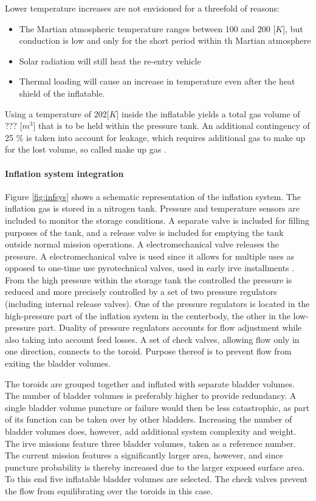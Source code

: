 Lower temperature increases are not envisioned for a threefold of reasons:

\begin{itemize}
\item The Martian atmospheric temperature ranges between 100 and 200 [$K$], but conduction is low and only for the short period within th Martian atmosphere
\item Solar radiation will still heat the re-entry vehicle
\item Thermal loading will cause an increase in temperature even after the heat shield of the inflatable.
\end{itemize}

Using a temperature of 202[$K$] inside the inflatable yields a total gas volume of ??? [$m^{3}$] that is to be held within the pressure tank. An additional contingency of 25 $\%$ is taken into account for leakage, which requires additional gas to make up for the lost volume, so called make up gas \cite{Jenkins2001}. 

\paragraph{Inflation system integration}


Figure \ref{fig:infsys} shows a schematic representation of the inflation system. The inflation gas is stored in a nitrogen tank. Pressure and temperature sensors are included to monitor the storage conditions. A separate valve is included for filling purposes of the tank, and a release valve is included for emptying the tank outside normal mission operations. A electromechanical valve releases the pressure. A electromechanical valve is used since it allows for multiple uses as opposed to one-time use pyrotechnical valves, used in early \gls{irve} installments \cite{Hughes2005}. From the high pressure within the storage tank the controlled the pressure is reduced and more precisely controlled by a set of two pressure regulators (including internal release valves). One of the pressure regulators is located in the high-pressure part of the inflation system in the centerbody, the other in the low-pressure part. Duality of pressure regulators accounts for flow adjustment while also taking into account feed losses. A set of check valves, allowing flow only in one direction, connects to the toroid. Purpose thereof is to prevent flow from exiting the bladder volumes. 

The toroids are grouped together and inflated with separate bladder volumes.  The number of bladder volumes is preferably higher to provide redundancy. A single bladder volume puncture or failure would then be less catastrophic, as part of its function can be taken over by other bladders. Increasing the number of bladder volumes does, however, add additional system complexity and weight. The \gls{irve} missions feature three bladder volumes, taken as a reference number. The current mission features a significantly larger area, however, and since puncture probability is thereby increased due to the larger exposed surface area. To this end five inflatable bladder volumes are selected. The check valves prevent the flow from equilibrating over the toroids in this case.

